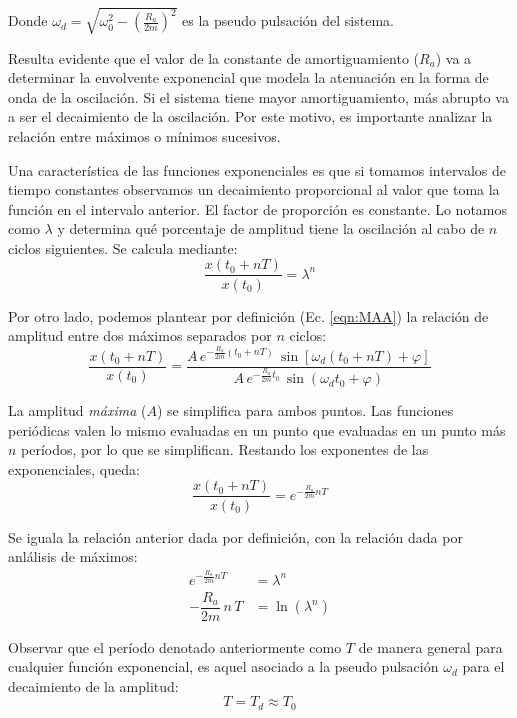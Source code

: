 \documentclass[a5paper,12pt,twoside]{book}
\begin{document}
Donde $\omega_d=\sqrt{\omega_0^2 - \left(\tfrac{R_a}{2m}\right)^2 }$ es la pseudo pulsación del sistema.

Resulta evidente que el valor de la constante de amortiguamiento ($R_a$) va a determinar la envolvente exponencial que modela la atenuación en la forma de onda de la oscilación. Si el sistema tiene mayor amortiguamiento, más abrupto va a ser el decaimiento de la oscilación. Por este motivo, es importante analizar la relación entre máximos o mínimos sucesivos.

Una característica de las funciones exponenciales es que si tomamos intervalos de tiempo constantes observamos un decaimiento proporcional al valor que toma la función en el intervalo anterior. El factor de proporción es constante. Lo notamos como $\lambda$ y determina qué porcentaje de amplitud tiene la oscilación al cabo de $n$ ciclos siguientes. Se calcula mediante:
\begin{equation*}
    \dfrac{x(t_0+nT)}{x(t_0)}=\lambda^n
\end{equation*}

Por otro lado, podemos plantear por definición (Ec. \ref{eqn:MAA}) la relación de amplitud entre dos máximos separados por $n$ ciclos:
\begin{equation*}
    \dfrac{x(t_0+nT)}{x(t_0)} = \dfrac
    {A\,e^{-\tfrac{R_a}{2m}(t_0+nT)} \, \sin \left[\omega_d (t_0+nT)+\varphi \right]}
    {A\,e^{-\tfrac{R_a}{2m} t_0} \, \sin \left(\omega_d t_0+\varphi \right)}
\end{equation*}

La amplitud \emph{máxima} ($A$) se simplifica para ambos puntos. Las funciones periódicas valen lo mismo evaluadas en un punto que evaluadas en un punto más $n$ períodos, por lo que se simplifican. Restando los exponentes de las exponenciales, queda:
\begin{equation*}
    \dfrac{x(t_0+nT)}{x(t_0)} = e^{-\tfrac{R_a}{2m} n T}
\end{equation*}

Se iguala la relación anterior dada por definición, con la relación dada por anlálisis de máximos:
\begin{align*}
    e^{-\tfrac{R_a}{2m} nT} &= \lambda^n
    \\
    -\dfrac{R_a}{2m} \, n \, T &= \ln (\lambda^n)
\end{align*}

Observar que el período denotado anteriormente como $T$ de manera general para cualquier función exponencial, es aquel asociado a la pseudo pulsación $\omega_d$ para el decaimiento de la amplitud:
\begin{equation*}
    T = T_d \approx T_0
\end{equation*}
\end{document}
